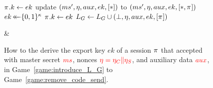 \begin{figure}
\begin{leftfullpage}
\begin{adjustbox}{tabular={cc},Trim=0.9ex 0 0 0, width=\textwidth}
\begin{adjustbox}{minipage=[t][]{\codewidth},fbox}
\begin{algorithmic}[1]
			\State \hspace*{-\algorithmicindent} 
			 \label{alg:line:send_game_hops_CheckKey}	
				\State $\oracle.\key \gets ek$
				\State update\hspace*{-0.9pt} $(ms', \eta, aux, ek, [*])$ \hspace*{-0.5pt}to\hspace*{-0.5pt} $(ms', \nonce, aux, ek, [*,\oracle])$\hspace{-2pt}
			\color{black}		
			\Else 
				\State {}
				\State $ek \operatorname{\leftarrow\mathrel{\mkern-14mu}\leftarrow} \lbrace 0, 1 \rbrace^\kappa$
				\color{black}
				\State $\oracle.\key \gets ek$
				\color{black}
				\State $L_G \gets L_G \cup  (\bot, \nonce, aux, ek, [\oracle])$\label{alg:line:send_game_drop_ms}
			\EndIf
			
		\end{algorithmic}
	\end{adjustbox}
	
	&
	
\end{adjustbox}


\caption{How to the derive the export key $ek$ of a session $\oracle$ that accepted with master secret $\textcolor{red}{ms}$, 
nonces $\textcolor{red}{\eta = \eta_{C} \|  \eta_{S}}$, and auxiliary data $\textcolor{red}{aux}$,
in Game~\ref{game:introduce_L_G} to Game~\ref{game:remove_code_send}.
}
\label{fig:code_for_game_hops_Send}

	\end{leftfullpage}

\end{figure}
